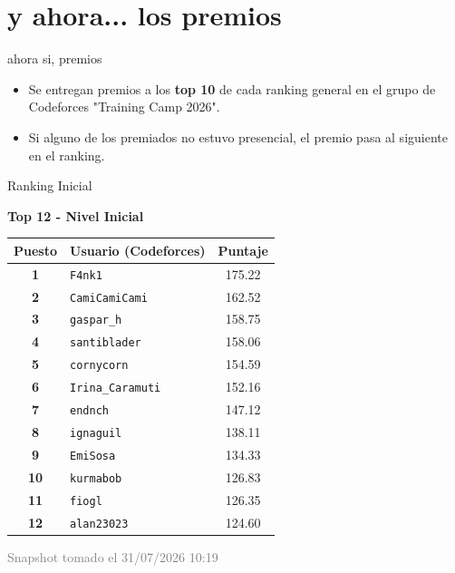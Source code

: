 \documentclass{beamer}
\begin{document}
\section{y ahora... los premios}



\begin{frame}{ahora si, premios}
    \begin{itemize}
        \item Se entregan premios a los \textbf{top 10} de cada ranking general en el grupo de Codeforces "Training Camp 2026".
        \item Si alguno de los premiados no estuvo presencial, el premio pasa al siguiente en el ranking.
    \end{itemize}
\end{frame}

\begin{frame}{Ranking Inicial}
\begin{center}
\large
\textbf{Top 12 - Nivel Inicial}

\vspace{0.3cm}

\small
\begin{tabular}{c l c}
\hline
\textbf{Puesto} & \textbf{Usuario (Codeforces)} & \textbf{Puntaje} \\
\hline
        \textbf{1} & \texttt{F4nk1} & 175.22 \\
        \textbf{2} & \texttt{CamiCamiCami} & 162.52 \\
        \textbf{3} & \texttt{gaspar\_h} & 158.75 \\
        \textbf{4} & \texttt{santiblader} & 158.06 \\
        \textbf{5} & \texttt{cornycorn} & 154.59 \\
        \textbf{6} & \texttt{Irina\_Caramuti} & 152.16 \\
        \textbf{7} & \texttt{endnch} & 147.12 \\
        \textbf{8} & \texttt{ignaguil} & 138.11 \\
        \textbf{9} & \texttt{EmiSosa} & 134.33 \\
        \textbf{10} & \texttt{kurmabob} & 126.83 \\
        \textbf{11} & \texttt{fiogl} & 126.35 \\
        \textbf{12} & \texttt{alan23023} & 124.60 \\
\hline
\end{tabular}

\vspace{0.4cm}
\footnotesize
\textcolor{gray}{Snapshot tomado el 31/07/2026 10:19}
\end{center}
\end{frame}
\end{document}
